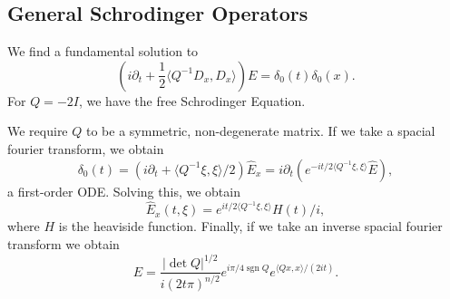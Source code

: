 \documentclass[12pt]{scrartcl}
\renewcommand{\hat}{\widehat}
\newcommand{\<}{\langle}
\renewcommand{\>}{\rangle}
\begin{document}
\subsection{General Schrodinger Operators}
We find a fundamental solution to 
$$(i\partial_t + \frac{1}{2} \<Q^{-1}D_x, D_x\>)E = \delta_0(t) \delta_0(x).$$
For $Q = -2I$, we have the free Schrodinger Equation.

We require $Q$ to be a symmetric, non-degenerate matrix.  If we take a spacial fourier transform, we obtain
$$\delta_0(t) = (i \partial_t + \<Q^{-1}\xi, \xi\>/2)\hat{E}_x = i\partial_t (e^{-it/2\<Q^{-1}\xi, \xi\>} \hat{E}),$$
a first-order ODE.  Solving this, we obtain
$$\hat{E}_x(t, \xi) = e^{it/2 \<Q^{-1}\xi, \xi\>}H(t)/i,$$
where $H$ is the heaviside function.  Finally, if we take an inverse spacial fourier transform we obtain
$$E = \frac{|\det Q|^{1/2}}{i(2t \pi)^{n/2}}e^{i\pi/4 \operatorname{sgn}{Q}} e^{\<Qx, x\>/(2it)}.$$
\end{document}
